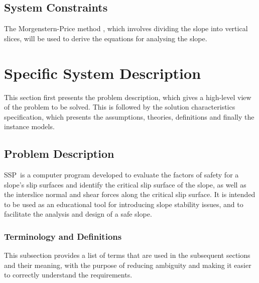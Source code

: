 \documentclass[12pt]{article}
\newcommand{\progname}{SSP}
\begin{document}
\subsection{System Constraints} \label{sec_SystConstraints}

The Morgenstern-Price method \citep{MorgPrice}, which involves dividing the 
slope into vertical 
slices, will be used to derive the equations for analysing the slope. 

\section{Specific System Description}

This section first presents the problem description, which gives a
high-level view of the problem to be solved.  This is followed by the
solution characteristics specification, which presents the
assumptions, theories, definitions and finally the instance models.

\subsection{Problem Description} \label{Sec_pd}

\progname\ is a computer program developed to evaluate the factors of safety 
for a slope's slip surfaces and identify the critical slip surface of the 
slope, as well as the interslice normal and shear forces along the critical 
slip surface. It is intended to be used as an educational tool for introducing 
slope stability issues, and to facilitate the analysis and design of a safe 
slope.

\subsubsection{Terminology and Definitions}

This subsection provides a list of terms that are used in the subsequent
sections and their meaning, with the purpose of reducing ambiguity and
 making it easier to correctly understand the requirements.
\end{document}
